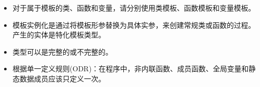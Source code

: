 
\begin{itemize}
\item 
对于属于模板的类、函数和变量，请分别使用类模板、函数模板和变量模板。

\item 
模板实例化是通过将模板形参替换为具体实参，来创建常规类或函数的过程。产生的实体是特化模板类型。

\item 
类型可以是完整的或不完整的。

\item 
根据单一定义规则(ODR)：在程序中，非内联函数、成员函数、全局变量和静态数据成员应该只定义一次。
\end{itemize}